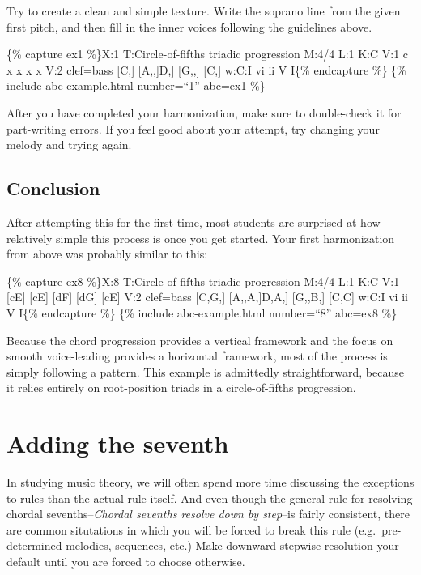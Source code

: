 \documentclass{book}
\begin{document}
Try to create a clean and simple texture. Write the soprano line from the
given first pitch, and then fill in the inner voices following the guidelines
above.

\{\% capture ex1 \%\}X:1 T:Circle-of-fifths triadic progression M:4/4 L:1 K:C
V:1 c\textbar{} x\textbar{} x\textbar{} x\textbar{} x\textbar{]} V:2 clef=bass
{[}C,{]}\textbar{} {[}A,,{]}\textbar{[}D,{]}\textbar{} {[}G,,{]}\textbar{}
{[}C,{]}\textbar{]} w:C:I vi ii V I\{\% endcapture \%\} \{\% include
abc-example.html number=``1'' abc=ex1 \%\}

After you have completed your harmonization, make sure to double-check it for
part-writing errors. If you feel good about your attempt, try changing your
melody and trying again.

\hypertarget{conclusion-18}{%
\subsection{Conclusion}\label{conclusion-18}}

After attempting this for the first time, most students are surprised at how
relatively simple this process is once you get started. Your first
harmonization from above was probably similar to this:

\{\% capture ex8 \%\}X:8 T:Circle-of-fifths triadic progression M:4/4 L:1 K:C
V:1 {[}cE{]}\textbar{} {[}cE{]}\textbar{} {[}dF{]}\textbar{}
{[}dG{]}\textbar{} {[}cE{]}\textbar{]} V:2 clef=bass {[}C,G,{]}\textbar{}
{[}A,,A,{]}\textbar{[}D,A,{]}\textbar{} {[}G,,B,{]}\textbar{}
{[}C,C{]}\textbar{]} w:C:I vi ii V I\{\% endcapture \%\} \{\% include
abc-example.html number=``8'' abc=ex8 \%\}

Because the chord progression provides a vertical framework and the focus on
smooth voice-leading provides a horizontal framework, most of the process is
simply following a pattern. This example is admittedly straightforward,
because it relies entirely on root-position triads in a circle-of-fifths
progression.

\hypertarget{adding-the-seventh}{%
\section{Adding the seventh}\label{adding-the-seventh}}

In studying music theory, we will often spend more time discussing the
exceptions to rules than the actual rule itself. And even though the general
rule for resolving chordal sevenths--\emph{Chordal sevenths resolve down by
step}--is fairly consistent, there are common situtations in which you will be
forced to break this rule (e.g.~pre-determined melodies, sequences, etc.) Make
downward stepwise resolution your default until you are forced to choose
otherwise.
\end{document}
